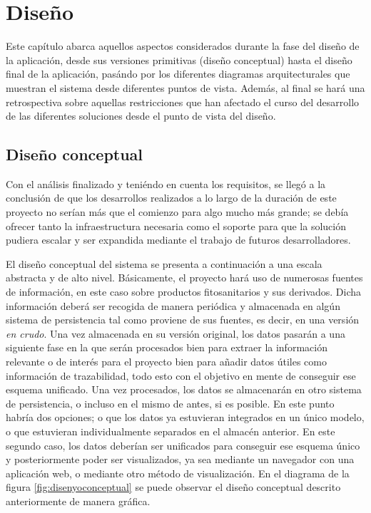 \chapter{Diseño}  \label{disenyo}

Este capítulo abarca aquellos aspectos considerados durante la fase del diseño de la aplicación, desde sus versiones primitivas (diseño conceptual) hasta el diseño final de la aplicación, pasándo por los diferentes diagramas arquitecturales que muestran el sistema desde diferentes puntos de vista. Además, al final se hará una retrospectiva sobre aquellas restricciones que han afectado el curso del desarrollo de las diferentes soluciones desde el punto de vista del diseño. 


\section{Diseño conceptual} \label{disenyo.conceptual}
Con el análisis finalizado y teniéndo en cuenta los requisitos, se llegó a la conclusión de que los desarrollos realizados a lo largo de la duración de este proyecto no serían más que el comienzo para algo mucho más grande; se debía ofrecer tanto la infraestructura necesaria como el soporte para que la solución pudiera escalar y ser expandida mediante el trabajo de futuros desarrolladores. 


\par 
El diseño conceptual del sistema se presenta a continuación a una escala abstracta y de alto nivel. Básicamente, el proyecto hará uso de numerosas fuentes de información, en este caso sobre productos fitosanitarios y sus derivados. Dicha información deberá ser recogida de manera periódica y almacenada en algún sistema de persistencia tal como proviene de sus fuentes, es decir, en una versión \textit{en crudo}. Una vez almacenada en su versión original, los datos pasarán a una siguiente fase en la que serán procesados bien para extraer la información relevante o de interés para el proyecto bien para añadir datos útiles como información de trazabilidad, todo esto con el objetivo en mente de conseguir ese esquema unificado. Una vez procesados, los datos se almacenarán en otro sistema de persistencia, o incluso en el mismo de antes, si es posible. En este punto habría dos opciones; o que los datos ya estuvieran integrados en un único modelo, o que estuvieran individualmente separados en el almacén anterior. En este segundo caso, los datos deberían ser unificados para conseguir ese esquema único y posteriormente poder ser visualizados, ya sea mediante un navegador con una aplicación web, o mediante otro método de visualización. En el diagrama de la figura \ref{fig:disenyoconceptual} se puede observar el diseño conceptual descrito anteriormente de manera gráfica. 

